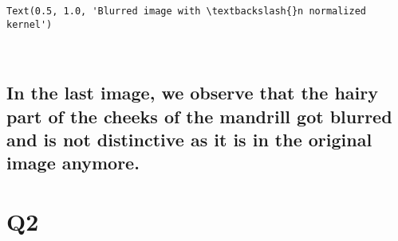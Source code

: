 \documentclass[11pt]{article}
\makeatletter
\newcommand{\boxspacing}{\kern\kvtcb@left@rule\kern\kvtcb@boxsep}
\newcommand{\prompt}[4]{
        {\ttfamily\llap{{\color{#2}[#3]:\hspace{3pt}#4}}\vspace{-\baselineskip}}
    }
\makeatother
\begin{document}
            \begin{tcolorbox}[breakable, size=fbox, boxrule=.5pt, pad at break*=1mm, opacityfill=0]
\prompt{Out}{outcolor}{24}{\boxspacing}
\begin{Verbatim}[commandchars=\\\{\}]
Text(0.5, 1.0, 'Blurred image with \textbackslash{}n normalized kernel')
\end{Verbatim}
\end{tcolorbox}
        
    \begin{center}
    \end{center}
    { \hspace*{\fill} \\}
    
    \hypertarget{in-the-last-image-we-observe-that-the-hairy-part-of-the-cheeks-of-the-mandrill-got-blurred-and-is-not-distinctive-as-it-is-in-the-original-image-anymore.}{%
\subsection{In the last image, we observe that the hairy part of the
cheeks of the mandrill got blurred and is not distinctive as it is in
the original image
anymore.}\label{in-the-last-image-we-observe-that-the-hairy-part-of-the-cheeks-of-the-mandrill-got-blurred-and-is-not-distinctive-as-it-is-in-the-original-image-anymore.}}

    \hypertarget{q2}{%
\section{Q2}\label{q2}}
\end{document}
